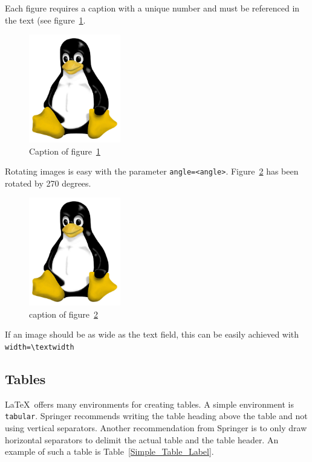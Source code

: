 \documentclass{llncs}
\begin{document}
Each figure requires a caption with a unique number and must be referenced in the text (see figure~\ref{Penguin_image_label}. 

\begin{figure}[htbp]
\begin{center}
\includegraphics[width=4cm]{images/Pinguin}
\caption{Caption of figure~\ref{Penguin_image_label}}
\label{Penguin_image_label} %
\end{center}
\end{figure}

Rotating images is easy with the parameter \texttt{angle=<angle>}. Figure~\ref{Penguin_image_rotated_label} has been rotated by 270 degrees.

\begin{figure}[htbp]
\begin{center}
\includegraphics[width=4cm,angle=270]{images/Pinguin}
\caption{caption of figure~\ref{Penguin_image_rotated_label}}
\label{Penguin_image_rotated_label} %
\end{center}
\end{figure}

If an image should be as wide as the text field, this can be easily achieved with \verb!width=\textwidth!

\subsection{Tables}

\LaTeX\ offers many environments for creating tables. A simple environment is \texttt{tabular}. Springer recommends writing the table heading above the table and not using vertical separators. Another recommendation from Springer is to only draw horizontal separators to delimit the actual table and the table header. An example of such a table is Table~\ref{Simple_Table_Label}.
\end{document}

